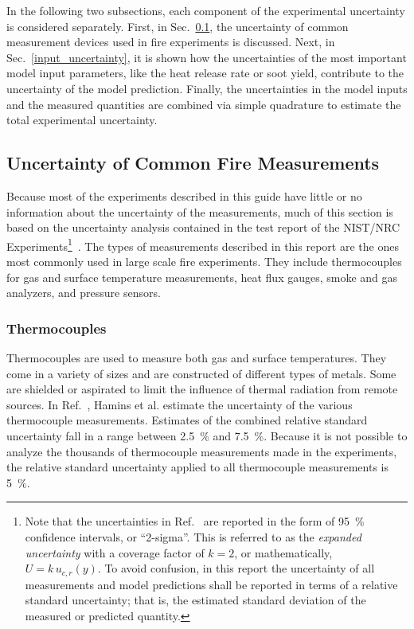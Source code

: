 In the following two subsections, each component of the experimental uncertainty is considered separately. First, in Sec.~\ref{measurement_uncertainty}, the uncertainty of common measurement devices used in fire experiments is discussed. Next, in Sec.~\ref{input_uncertainty}, it is shown how the uncertainties of the most important model input parameters, like the heat release rate or soot yield, contribute to the uncertainty of the model prediction. Finally, the uncertainties in the model inputs and the measured quantities are combined via simple quadrature to estimate the total experimental uncertainty.


\subsection{Uncertainty of Common Fire Measurements}
\label{measurement_uncertainty}

Because most of the experiments described in this guide have little or no information about the uncertainty of the measurements, much of this section is based on the uncertainty analysis contained in the test report of the NIST/NRC Experiments\footnote{Note that the uncertainties in Ref.~\cite{Hamins:SP1013-1} are reported in the form of 95~\% confidence intervals, or ``2-sigma''. This is referred to as the {\it expanded uncertainty} with a coverage factor of $k=2$, or mathematically, $U=k \, u_{c,r}(y)$. To avoid confusion, in this report the uncertainty of all measurements and model predictions shall be reported in terms of a relative standard uncertainty; that is, the estimated standard deviation of the measured or predicted quantity.}~\cite{Hamins:SP1013-1}. The types of measurements described in this report are the ones most commonly used in large scale fire experiments. They include thermocouples for gas and surface temperature measurements, heat flux gauges, smoke and gas analyzers, and pressure sensors.

\subsubsection{Thermocouples}

Thermocouples are used to measure both gas and surface temperatures. They come in a variety of sizes and are constructed of different types of metals. Some are shielded or aspirated to limit the influence of thermal radiation from remote sources. In Ref.~\cite{Hamins:SP1013-1}, Hamins et al. estimate the uncertainty of the various thermocouple measurements. Estimates of the combined relative standard uncertainty fall in a range between 2.5~\% and 7.5~\%. Because it is not possible to analyze the thousands of thermocouple measurements made in the experiments, the relative standard uncertainty applied to all thermocouple measurements is 5~\%.


